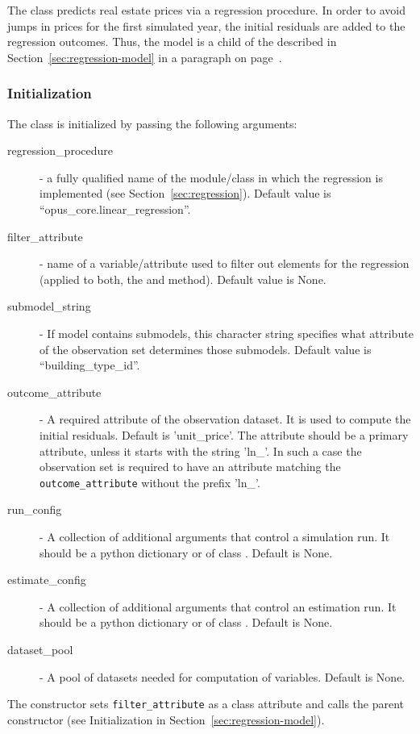 The  
class predicts real estate prices via a regression procedure.
In order to avoid jumps in prices for the first simulated year, the initial residuals are 
added to the regression outcomes. Thus,
the model is a child of the   
described in
Section~\ref{sec:regression-model} in a paragraph on page~\pageref{page:regression-model-with-initial-residuals}.

\subsubsection{Initialization}
%
The class is initialized by passing the following arguments:
\begin{description}
\item[regression_procedure] - a fully qualified name of the module/class in
  which the regression is implemented (see
  Section~\ref{sec:regression}). Default value is
  ``opus_core.linear_regression''.
\item[filter_attribute] - name of a variable/attribute used to filter out elements for
  the regression (applied to both, the  and 
  method). Default value is None.
\item[submodel_string] - If model contains submodels, this character string
  specifies what attribute of the observation set determines those
  submodels. Default value is ``building_type_id''.
\item[outcome_attribute] - A required attribute of the observation dataset. It is used to compute the 
initial residuals. Default is 'unit_price'. The attribute should be a primary attribute, unless 
it starts with the string 'ln_'. In such a case the observation set is required to have an attribute 
matching the \verb|outcome_attribute| without the prefix 'ln_'. 
\item[run_config] - A collection of additional arguments that control a
  simulation run. It should be a python dictionary or of class . Default is None.
\item[estimate_config] - A collection of additional arguments that control an
  estimation run. It should be a python dictionary or of class . Default is None.
  \item[dataset_pool] - A pool of datasets needed for computation of variables. Default is None.
\end{description}
The constructor sets \verb|filter_attribute| as a class attribute and calls the parent
constructor (see Initialization in Section~\ref{sec:regression-model}).

